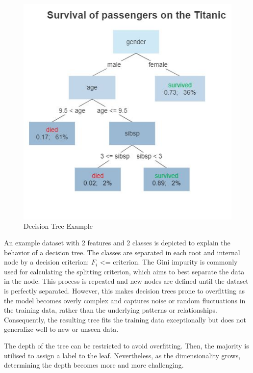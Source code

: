 \begin{figure}[H]
	\centering
	\includegraphics[width=150mm]{figs/decision_tree}
	\caption[Decision Tree Example]{Decision Tree Example} 
	\label{fig:decision_tree}
\end{figure}

An example dataset with 2 features and 2 classes is depicted to explain the behavior of a decision tree. The classes are separated in each root and internal node by a decision criterion: $F_i$ <= criterion. The Gini impurity is commonly used for calculating the splitting criterion, which aims to best separate the data in the node. This process is repeated and new nodes are defined until the dataset is perfectly separated. However, this makes decision trees prone to overfitting as the model becomes overly complex and captures noise or random fluctuations in the training data, rather than the underlying patterns or relationships. Consequently, the resulting tree fits the training data exceptionally but does not generalize well to new or unseen data. 

The depth of the tree can be restricted to avoid overfitting. Then, the majority is utilised to assign a label to the leaf. Nevertheless, as the dimensionality grows, determining the depth becomes more and more challenging.

